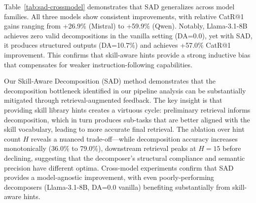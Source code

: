 Table~\ref{tab:sad-crossmodel} demonstrates that SAD generalizes across model families. All three models show consistent improvements, with relative CatR@1 gains ranging from +26.9\% (Mistral) to +59.9\% (Qwen). Notably, Llama-3.1-8B achieves zero valid decompositions in the vanilla setting (DA=0.0), yet with SAD, it produces structured outputs (DA=10.7\%) and achieves +57.0\% CatR@1 improvement. This confirms that skill-aware hints provide a strong inductive bias that compensates for weaker instruction-following capabilities.



Our Skill-Aware Decomposition (SAD) method demonstrates that the decomposition bottleneck identified in our pipeline analysis can be substantially mitigated through retrieval-augmented feedback. The key insight is that providing skill library hints creates a virtuous cycle: preliminary retrieval informs decomposition, which in turn produces sub-tasks that are better aligned with the skill vocabulary, leading to more accurate final retrieval. The ablation over hint count $H$ reveals a nuanced trade-off---while decomposition accuracy increases monotonically (36.0\% to 79.0\%), downstream retrieval peaks at $H{=}15$ before declining, suggesting that the decomposer's structural compliance and semantic precision have different optima. Cross-model experiments confirm that SAD provides a model-agnostic improvement, with even poorly-performing decomposers (Llama-3.1-8B, DA=0.0 vanilla) benefiting substantially from skill-aware hints.
